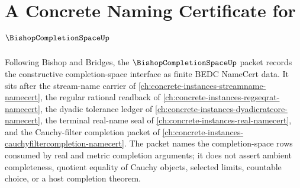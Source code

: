 \chapter{A Concrete Naming Certificate for $\BishopCompletionSpaceUp$}
\label{ch:concrete-instances-bishop-completion-space-namecert}

Following Bishop and Bridges, the $\BishopCompletionSpaceUp$ packet records the constructive completion-space interface as finite BEDC NameCert data. It sits after the stream-name carrier of \autoref{ch:concrete-instances-streamname-namecert}, the regular rational readback of \autoref{ch:concrete-instances-regseqrat-namecert}, the dyadic tolerance ledger of \autoref{ch:concrete-instances-dyadicratcore-namecert}, the terminal real-name seal of \autoref{ch:concrete-instances-real-namecert}, and the Cauchy-filter completion packet of \autoref{ch:concrete-instances-cauchyfiltercompletion-namecert}. The packet names the completion-space rows consumed by real and metric completion arguments; it does not assert ambient completeness, quotient equality of Cauchy objects, selected limits, countable choice, or a host completion theorem.

